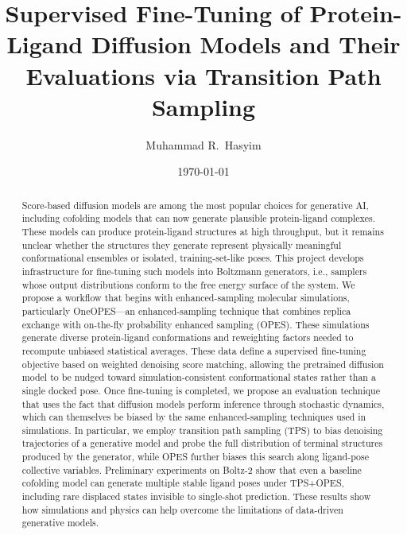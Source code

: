 \documentclass[aps,prl,twocolumn,superscriptaddress,floatfix]{revtex4-2}
\begin{document}
\title{Supervised Fine-Tuning of Protein-Ligand Diffusion Models and Their Evaluations via Transition Path Sampling}

\author{Muhammad R.~Hasyim}

\date{\today}

\begin{abstract}
Score-based diffusion models are among the most popular choices for generative
AI, including cofolding models that can now generate plausible protein-ligand
complexes. These models can produce protein-ligand structures at high
throughput, but it remains unclear whether the structures they generate
represent physically meaningful conformational ensembles or isolated,
training-set-like poses. This project develops infrastructure for fine-tuning
such models into Boltzmann generators, i.e., samplers whose output distributions
conform to the free energy surface of the system. We propose a workflow that
begins with enhanced-sampling molecular simulations, particularly OneOPES—an
enhanced-sampling technique that combines replica exchange with on-the-fly
probability enhanced sampling (OPES). These simulations generate diverse
protein-ligand conformations and reweighting factors needed to recompute
unbiased statistical averages. These data define a supervised fine-tuning
objective based on weighted denoising score matching, allowing the pretrained
diffusion model to be nudged toward simulation-consistent conformational states
rather than a single docked pose. Once fine-tuning is completed, we propose an
evaluation technique that uses the fact that diffusion models perform inference
through stochastic dynamics, which can themselves be biased by the same
enhanced-sampling techniques used in simulations. In particular, we employ
transition path sampling (TPS) to bias denoising trajectories of a generative
model and probe the full distribution of terminal structures produced by the
generator, while OPES further biases this search along ligand-pose collective
variables. Preliminary experiments on Boltz-2 show that even a baseline
cofolding model can generate multiple stable ligand poses under TPS+OPES,
including rare displaced states invisible to single-shot prediction. These
results show how simulations and physics can help overcome the limitations of
data-driven generative models.
\end{abstract}

\maketitle
\end{document}
